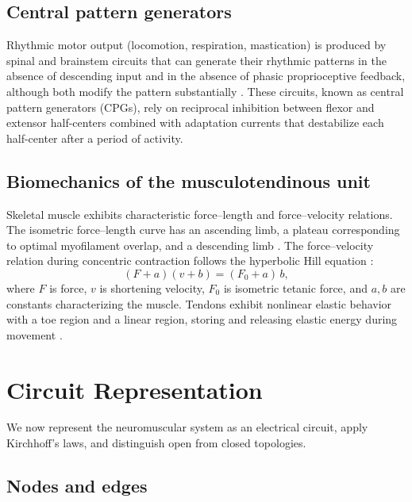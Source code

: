 \documentclass[11pt,twocolumn,a4paper]{article}
\theoremstyle{definition}
\theoremstyle{remark}
\begin{document}
\subsection{Central pattern generators}

Rhythmic motor output (locomotion, respiration, mastication) is
produced by spinal and brainstem circuits that can generate their
rhythmic patterns in the absence of descending input and in the
absence of phasic proprioceptive feedback, although both modify the pattern substantially \citep{grillner1985,grillner2003,marder2001}.
These circuits, known as central pattern generators (CPGs), rely on
reciprocal inhibition between flexor and extensor half-centers
combined with adaptation currents that destabilize each half-center
after a period of activity.

\subsection{Biomechanics of the musculotendinous unit}

Skeletal muscle exhibits characteristic force--length and
force--velocity relations. The isometric force--length curve has an
ascending limb, a plateau corresponding to optimal myofilament
overlap, and a descending limb \citep{gordon1966}. The
force--velocity relation during concentric contraction follows the
hyperbolic Hill equation \citep{hill1938}:
\begin{equation}
(F + a)(v + b) = (F_0 + a)\,b,
\label{eq:hill}
\end{equation}
where $F$ is force, $v$ is shortening velocity, $F_0$ is isometric
tetanic force, and $a, b$ are constants characterizing the muscle.
Tendons exhibit nonlinear elastic behavior with a toe region and a
linear region, storing and releasing elastic energy during movement
\citep{alexander1990,ker1988}.


\section{Circuit Representation}
\label{sec:circuit-representation}

We now represent the neuromuscular system as an electrical circuit,
apply Kirchhoff's laws, and distinguish open from closed topologies.

\subsection{Nodes and edges}
\end{document}

